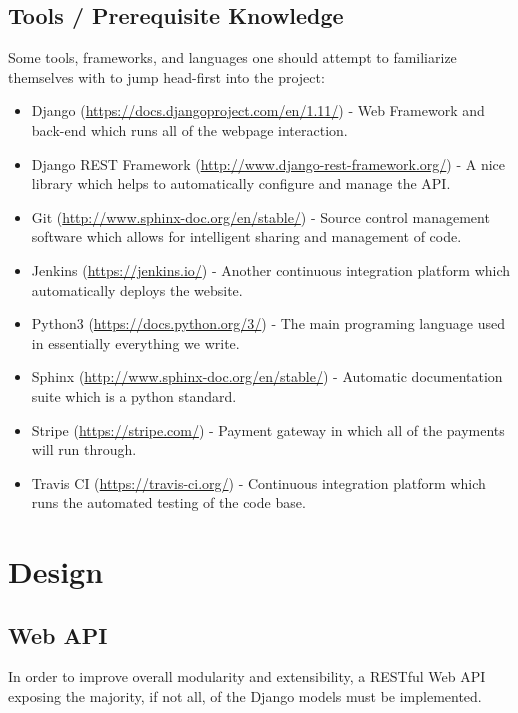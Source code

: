\documentclass{article}
\begin{document}
\subsection{Tools / Prerequisite Knowledge}
Some tools, frameworks, and languages one should attempt to familiarize
themselves with to jump head-first into the project:
\begin{itemize}
    \item Django (\url{https://docs.djangoproject.com/en/1.11/}) - Web
          Framework and back-end which runs all of the webpage interaction.
    \item Django REST Framework (\url{http://www.django-rest-framework.org/}) -
          A nice library which helps to automatically configure and manage the
          API.
    \item Git (\url{http://www.sphinx-doc.org/en/stable/}) - Source control
          management software which allows for intelligent sharing and
          management of code.
    \item Jenkins (\url{https://jenkins.io/}) - Another continuous
          integration platform which automatically deploys the website.
    \item Python3 (\url{https://docs.python.org/3/}) - The main programing
          language used in essentially everything we write.
    \item Sphinx (\url{http://www.sphinx-doc.org/en/stable/}) - Automatic
          documentation suite which is a python standard.
    \item Stripe (\url{https://stripe.com/}) - Payment gateway in which all of
          the payments will run through.
    \item Travis CI (\url{https://travis-ci.org/}) - Continuous integration
          platform which runs the automated testing of the code base.
\end{itemize}

\section{Design}
\subsection{Web API}
In order to improve overall modularity and extensibility, a RESTful Web API
exposing the majority, if not all, of the Django models must be implemented.
\end{document}
